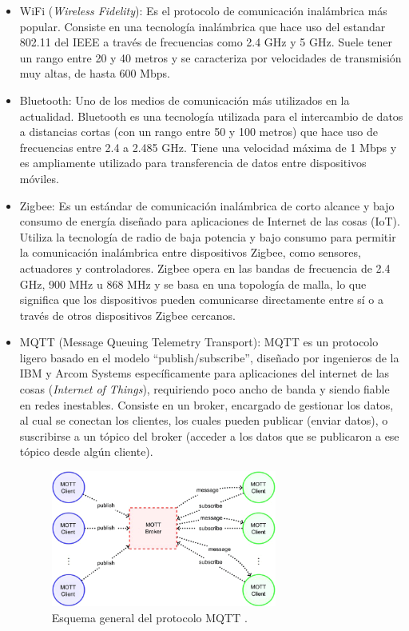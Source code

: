 \begin{itemize}
    \item WiFi (\textit{Wireless Fidelity}): Es el protocolo de comunicación inalámbrica más popular. Consiste en una tecnología inalámbrica que hace uso del estandar 802.11 del IEEE a través de frecuencias como 2.4 GHz y 5 GHz. Suele tener un rango entre 20 y 40 metros y se caracteriza por velocidades de transmisión muy altas, de hasta 600 Mbps.
    
    \item Bluetooth: Uno de los medios de comunicación más utilizados en la actualidad. Bluetooth es una tecnología utilizada para el intercambio de datos a distancias cortas (con un rango entre 50 y 100 metros) que hace uso de frecuencias entre 2.4 a 2.485 GHz. Tiene una velocidad máxima de 1 Mbps y es ampliamente utilizado para transferencia de datos entre dispositivos móviles.
    
    \item Zigbee: Es un estándar de comunicación inalámbrica de corto alcance y bajo consumo de energía diseñado para aplicaciones de Internet de las cosas (IoT). Utiliza la tecnología de radio de baja potencia y bajo consumo para permitir la comunicación inalámbrica entre dispositivos Zigbee, como sensores, actuadores y controladores. Zigbee opera en las bandas de frecuencia de 2.4 GHz, 900 MHz u 868 MHz y se basa en una topología de malla, lo que significa que los dispositivos pueden comunicarse directamente entre sí o a través de otros dispositivos Zigbee cercanos. 
    
    \item MQTT (Message Queuing Telemetry Transport): MQTT es un protocolo ligero basado en el modelo ``publish/subscribe'', diseñado por ingenieros de la IBM y Arcom Systems específicamente para aplicaciones del internet de las cosas (\textit{Internet of Things}), requiriendo poco ancho de banda y siendo fiable en redes inestables. Consiste en un broker, encargado de gestionar los datos, al cual se conectan los clientes, los cuales pueden publicar (enviar datos), o suscribirse a un tópico del broker (acceder a los datos que se publicaron a ese tópico desde algún cliente).
    
    \begin{figure}[H]
        \centering
        \includegraphics[width = 0.7\textwidth]{imagenes/cap1_marcoteo/MQTT-protocol-model.png}
        \caption{Esquema general del protocolo MQTT \citep{aloufi2020hybrid}.}
        \label{fig:mqtt}
    \end{figure}
    
\end{itemize}

